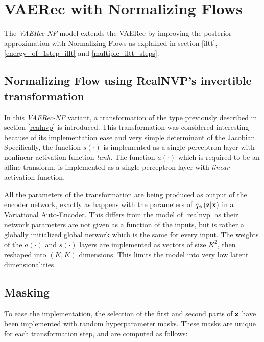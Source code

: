\section{VAERec with Normalizing Flows}

The \emph{VAERec-NF} model
extends the VAERec by improving the posterior approximation
with Normalizing Flows \cite{1505.05770}
as explained in section \ref{iltt}, 
\ref{energy_of_1step_illt}
and \ref{multiple_iltt_steps}.

\subsection{Normalizing Flow using RealNVP's invertible transformation}

In this \emph{VAERec-NF} variant, a transformation of the type previously described
in section \ref{realnvp} is introduced.
This transformation was considered interesting 
because of its implementation
ease and very simple determinant of the Jacobian.
Specifically, the function $s(\cdot)$ is implemented as
a single perceptron layer with nonlinear activation function 
\emph{tanh}. The function $a(\cdot)$ which is required to be an affine transform,
is implemented as a single perceptron layer with \emph{linear}
activation function.

All the parameters of the transformation are being produced as output of the
encoder network, exactly as happens with the parameters of $q_\phi\left(\mathbf{z}|\mathbf{x}\right)$ in a Variational
Auto-Encoder. This differs from the model of \ref{realnvp} as their network
parameters are not given as a function of the inputs, but is rather a
globally initialized global network which is the same for every input.
The weights of the $a(\cdot)$ and $s(\cdot)$ layers are implemented as vectors of size $K^2$, then
reshaped into $(K,K)$ dimensions. This limits the model into
very low latent dimensionalities.

\subsection{Masking}

To ease the implementation, the selection of the first and second parts of $\mathbf{z}$
have been implemented with random hyperparameter masks. These masks are unique for each transformation
step, and are computed as follows:

